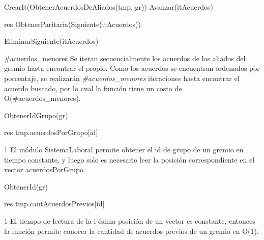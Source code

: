 
{
	\state {} \asig CrearIt(ObtenerAcuerdosDeAliados(tmp, gr))		
			
		\state
		\state Avanzar(itAcuerdos)  								
	\endwhile
	\state

	\state res \asig ObtenerParitaria(Siguiente(itAcuerdos))		

	\state EliminarSiguiente(itAcuerdos)							
}
{\#acuerdos\_menores}
{Se iteran secuencialmente los acuerdos de los aliados del gremio hasta encontrar el propio. Como los acuerdos se encuentran ordenados por porcentaje, se realizar\'an \emph{\#acuerdos\_menores} iteraciones hasta encontrar el acuerdo buscado, por lo cual la funci\'on tiene un costo de O(\#acuerdos\_menores). }


{
	\state {} \asig ObtenerIdGrupo(gr)		

	\state res \asig tmp.acuerdosPorGrupo[id]							
}
{1}
{ El m\'odulo SistemaLaboral permite obtener el id de grupo de un gremio en tiempo constante, y luego solo es necesario leer la posici\'on correspondiente en el vector acuerdosPorGrupo. }


{
	\state {} \asig ObtenerId(gr)			

	\state res \asig tmp.cantAcuerdosPrevios[id]					
}
{1}
{ El tiempo de lectura de la i-\'esima posici\'on de un vector es constante, entonces la funci\'on permite conocer la cantidad de acuerdos previos de un gremio en O(1). }

